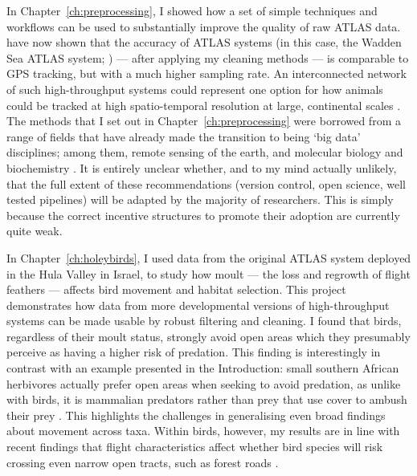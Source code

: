 In Chapter~\ref{ch:preprocessing}, I showed how a set of simple techniques and workflows can be used to substantially improve the quality of raw ATLAS data.
\textcite[]{beardsworth2022mee} have now shown that the accuracy of ATLAS systems (in this case, the Wadden Sea ATLAS system; \cite{bijleveld2021}) --- after applying my cleaning methods --- is comparable to GPS tracking, but with a much higher sampling rate.
An interconnected network of such high-throughput systems could represent one option for how animals could be tracked at high spatio-temporal resolution at large, continental scales \citep{nathan2022}.
The methods that I set out in Chapter~\ref{ch:preprocessing} were borrowed from a range of fields that have already made the transition to being `big data' disciplines; among them, remote sensing of the earth, and molecular biology and biochemistry \parencite{peng2011,gorelick2017}.
It is entirely unclear whether, and to my mind actually unlikely, that the full extent of these recommendations (version control, open science, well tested pipelines) will be adapted by the majority of researchers.
This is simply because the correct incentive structures to promote their adoption are currently quite weak.

In Chapter~\ref{ch:holeybirds}, I used data from the original ATLAS system deployed in the Hula Valley in Israel, to study how moult --- the loss and regrowth of flight feathers --- affects bird movement and habitat selection.
This project demonstrates how data from more developmental versions of high-throughput systems can be made usable by robust filtering and cleaning.
I found that birds, regardless of their moult status, strongly avoid open areas which they presumably perceive as having a higher risk of predation.
This finding is interestingly in contrast with an example presented in the Introduction: small southern African herbivores actually prefer open areas when seeking to avoid predation, as unlike with birds, it is mammalian predators rather than prey that use cover to ambush their prey \parencite[][]{leroux2018}.
This highlights the challenges in generalising even broad findings about movement across taxa.
Within birds, however, my results are in line with recent findings that flight characteristics affect whether bird species will risk crossing even narrow open tracts, such as forest roads \citep{claramunt2022}.

